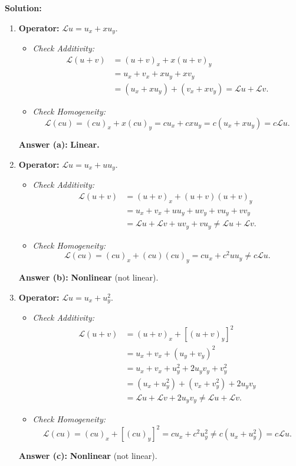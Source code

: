 \documentclass[11pt,a4paper]{article}
\begin{document}
\textbf{Solution:}
\begin{enumerate}[label=(\alph*)]
    \item \textbf{Operator:} $\mathcal{L}u = u_x + x u_y$.
    \begin{itemize}
        \item \emph{Check Additivity:}
        \begin{align*}
            \mathcal{L}(u + v) &= (u + v)_x + x(u + v)_y \\
            &= u_x + v_x + x u_y + x v_y \\
            &= (u_x + x u_y) + (v_x + x v_y) = \mathcal{L}u + \mathcal{L}v.
        \end{align*}
        \item \emph{Check Homogeneity:}
        \[
            \mathcal{L}(cu) = (cu)_x + x(cu)_y = c u_x + c x u_y = c(u_x + x u_y) = c\mathcal{L}u.
        \]
    \end{itemize}
    \textbf{Answer (a):} \textbf{Linear.}

    \item \textbf{Operator:} $\mathcal{L}u = u_x + u u_y$.
    \begin{itemize}
        \item \emph{Check Additivity:}
        \begin{align*}
            \mathcal{L}(u + v) &= (u + v)_x + (u + v)(u + v)_y \\
            &= u_x + v_x + u u_y + u v_y + v u_y + v v_y \\
            &= \mathcal{L}u + \mathcal{L}v + u v_y + v u_y \neq \mathcal{L}u + \mathcal{L}v.
        \end{align*}
        \item \emph{Check Homogeneity:}
        \[
            \mathcal{L}(cu) = (cu)_x + (cu)(cu)_y = c u_x + c^2 u u_y \neq c\mathcal{L}u.
        \]
    \end{itemize}
    \textbf{Answer (b):} \textbf{Nonlinear} (not linear).

    \item \textbf{Operator:} $\mathcal{L}u = u_x + u_y^2$.
    \begin{itemize}
        \item \emph{Check Additivity:}
        \begin{align*}
            \mathcal{L}(u + v) &= (u + v)_x + [(u + v)_y]^2 \\
            &= u_x + v_x + (u_y + v_y)^2 \\
            &= u_x + v_x + u_y^2 + 2u_y v_y + v_y^2 \\
            &= (u_x + u_y^2) + (v_x + v_y^2) + 2u_y v_y \\
            &= \mathcal{L}u + \mathcal{L}v + 2u_y v_y \neq \mathcal{L}u + \mathcal{L}v.
        \end{align*}
        \item \emph{Check Homogeneity:}
        \[
            \mathcal{L}(cu) = (cu)_x + [(cu)_y]^2 = c u_x + c^2 u_y^2 \neq c(u_x + u_y^2) = c\mathcal{L}u.
        \]
    \end{itemize}
    \textbf{Answer (c):} \textbf{Nonlinear} (not linear).


\end{enumerate}
\end{document}
